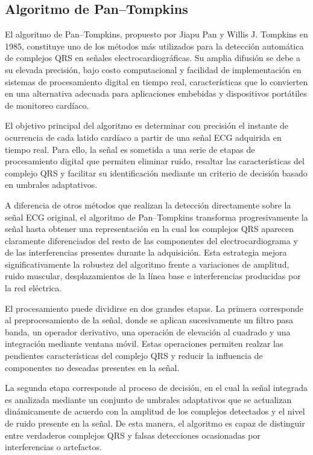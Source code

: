 \documentclass[12pt]{article}
\begin{document}
			\subsection{Algoritmo de Pan--Tompkins}

				El algoritmo de Pan--Tompkins, propuesto por Jiapu Pan y Willis J. Tompkins en 1985, constituye uno de los métodos más utilizados para la detección automática de complejos QRS en señales electrocardiográficas. Su amplia difusión se debe a su elevada precisión, bajo costo computacional y facilidad de implementación en sistemas de procesamiento digital en tiempo real, características que lo convierten en una alternativa adecuada para aplicaciones embebidas y dispositivos portátiles de monitoreo cardíaco.

				El objetivo principal del algoritmo es determinar con precisión el instante de ocurrencia de cada latido cardíaco a partir de una señal ECG adquirida en tiempo real. Para ello, la señal es sometida a una serie de etapas de procesamiento digital que permiten eliminar ruido, resaltar las características del complejo QRS y facilitar su identificación mediante un criterio de decisión basado en umbrales adaptativos.

				A diferencia de otros métodos que realizan la detección directamente sobre la señal ECG original, el algoritmo de Pan--Tompkins transforma progresivamente la señal hasta obtener una representación en la cual los complejos QRS aparecen claramente diferenciados del resto de las componentes del electrocardiograma y de las interferencias presentes durante la adquisición. Esta estrategia mejora significativamente la robustez del algoritmo frente a variaciones de amplitud, ruido muscular, desplazamientos de la línea base e interferencias producidas por la red eléctrica.

				El procesamiento puede dividirse en dos grandes etapas. La primera corresponde al preprocesamiento de la señal, donde se aplican sucesivamente un filtro pasa banda, un operador derivativo, una operación de elevación al cuadrado y una integración mediante ventana móvil. Estas operaciones permiten realzar las pendientes características del complejo QRS y reducir la influencia de componentes no deseadas presentes en la señal.

				La segunda etapa corresponde al proceso de decisión, en el cual la señal integrada es analizada mediante un conjunto de umbrales adaptativos que se actualizan dinámicamente de acuerdo con la amplitud de los complejos detectados y el nivel de ruido presente en la señal. De esta manera, el algoritmo es capaz de distinguir entre verdaderos complejos QRS y falsas detecciones ocasionadas por interferencias o artefactos.
\end{document}
